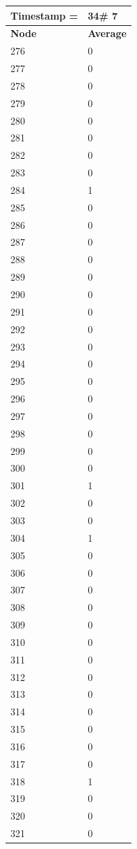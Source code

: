 \begin{tabular}{|l||l|}
\hline
\textbf{Timestamp =} & \textbf{34}\# 7\\\hline
	\textbf{Node} & \textbf{Average} \\ \hline
\hline
	276 & 0 \\ \hline
	277 & 0 \\ \hline
	278 & 0 \\ \hline
	279 & 0 \\ \hline
	280 & 0 \\ \hline
	281 & 0 \\ \hline
	282 & 0 \\ \hline
	283 & 0 \\ \hline
	284 & 1 \\ \hline
	285 & 0 \\ \hline
	286 & 0 \\ \hline
	287 & 0 \\ \hline
	288 & 0 \\ \hline
	289 & 0 \\ \hline
	290 & 0 \\ \hline
	291 & 0 \\ \hline
	292 & 0 \\ \hline
	293 & 0 \\ \hline
	294 & 0 \\ \hline
	295 & 0 \\ \hline
	296 & 0 \\ \hline
	297 & 0 \\ \hline
	298 & 0 \\ \hline
	299 & 0 \\ \hline
	300 & 0 \\ \hline
	301 & 1 \\ \hline
	302 & 0 \\ \hline
	303 & 0 \\ \hline
	304 & 1 \\ \hline
	305 & 0 \\ \hline
	306 & 0 \\ \hline
	307 & 0 \\ \hline
	308 & 0 \\ \hline
	309 & 0 \\ \hline
	310 & 0 \\ \hline
	311 & 0 \\ \hline
	312 & 0 \\ \hline
	313 & 0 \\ \hline
	314 & 0 \\ \hline
	315 & 0 \\ \hline
	316 & 0 \\ \hline
	317 & 0 \\ \hline
	318 & 1 \\ \hline
	319 & 0 \\ \hline
	320 & 0 \\ \hline
	321 & 0 \\ \hline
\end{tabular}

